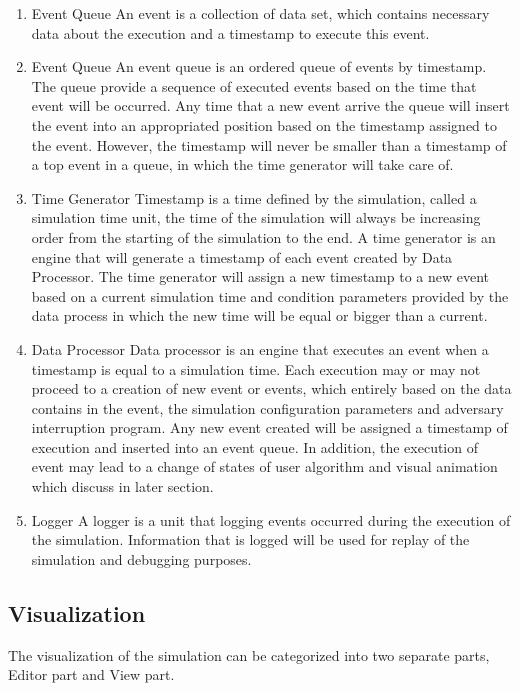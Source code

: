 \begin{enumerate}
\item{Event Queue}
An event is a collection of data set, which contains necessary data about the execution and a timestamp to execute this event.

\item{Event Queue}
An event queue is an ordered queue of events by timestamp. The queue provide a sequence of executed events based on the time that event will be occurred. Any time that a new event arrive the queue will insert the event into an appropriated position based on the timestamp assigned to the event. However, the timestamp will never be smaller than a timestamp of a top event in a queue, in which the time generator will take care of.

\item{Time Generator}
Timestamp is a time defined by the simulation, called a simulation time unit, the time of the simulation will always be increasing order from the starting of the simulation to the end. A time generator is an engine that will generate a timestamp of each event created by Data Processor. The time generator will assign a new timestamp to a new event based on a current simulation time and condition parameters provided by the data process in which the new time will be equal or bigger than a current.

\item{Data Processor}
Data processor is an engine that executes an event when a timestamp is equal to a simulation time. Each execution may or may not proceed to a creation of new event or events, which entirely based on the data contains in the event, the simulation configuration parameters and adversary interruption program. Any new event created will be assigned a timestamp of execution and inserted into an event queue. In addition, the execution of event may lead to a change of states of user algorithm and visual animation which discuss in later section.

\item{Logger}
A logger is a unit that logging events occurred during the execution of the simulation. Information that is logged will be used for replay of the simulation and debugging purposes.
\end{enumerate}


\subsection{Visualization}
The visualization of the simulation can be categorized into two separate parts, Editor part and View part.

